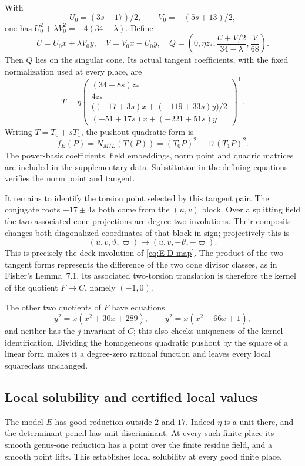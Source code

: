 \documentclass[11pt,a4paper]{article}
\theoremstyle{definition}\newtheorem{definition}[theorem]{Definition}
\theoremstyle{remark}\newtheorem{remark}[theorem]{Remark}
\begin{document}
With
\[
 U_0=(3s-17)/2,\qquad V_0=-(5s+13)/2,
\]
one has $U_0^2+\lambda V_0^2=-4(34-\lambda)$.  Define
\[
 U=U_0x+\lambda V_0y,\quad V=V_0x-U_0y,\quad
 Q=\left(0,\eta z_*,\frac{U+V/2}{34-\lambda},\frac V{68}\right).
\]
Then $Q$ lies on the singular cone.  Its actual tangent coefficients,
with the fixed normalization used at every place, are
\[
 T=\eta\begin{pmatrix}
 (34-8s)z_*\\
 4z_*\\
 \bigl((-17+3s)x+(-119+33s)y\bigr)/2\\
 (-51+17s)x+(-221+51s)y
 \end{pmatrix}^{\mathsf T}.
\]
Writing $T=T_0+sT_1$, the pushout quadratic form is
\begin{equation}\label{eq:final-norm-pushout}
 f_E(P)=N_{M/L}(T(P))=(T_0P)^2-17(T_1P)^2.
\end{equation}
The power-basis coefficients, field embeddings, norm point and quadric matrices are included in the supplementary data. Substitution in the defining equations verifies the norm point and tangent.

It remains to identify the torsion point selected by this tangent pair.
The conjugate roots $-17\pm4s$ both come from the $(u,v)$ block.
Over a splitting field the two associated cone projections are
degree-two involutions.  Their composite changes both diagonalized
coordinates of that block in sign; projectively this is
\[
 (u,v,\vartheta,\varpi)\longmapsto
                    (u,v,-\vartheta,-\varpi).
\]
This is precisely the deck involution of \eqref{eq:E-D-map}.
The product of the two tangent forms represents the difference of the
two cone divisor classes, as in Fisher's Lemma~7.1.  Its associated
two-torsion translation is therefore the kernel of the quotient
$F\longrightarrow C$, namely $(-1,0)$.  

The other two quotients of
$F$ have equations
\[
 y^2=x(x^2+30x+289),\qquad y^2=x(x^2-66x+1),
\]
and neither has the $j$-invariant of $C$; this also checks uniqueness
of the kernel identification.    Dividing the homogeneous
quadratic pushout by the square of a linear form makes it a degree-zero
rational function and leaves every local squareclass unchanged.

\subsection{Local solubility and certified local values}

The model $E$ has good reduction outside $2$ and $17$.  Indeed $\eta$
is a unit there, and the determinant pencil has unit discriminant.
At every such finite place its smooth genus-one reduction has a point
over the finite residue field, and a smooth point lifts.  This establishes local solubility at every good finite place.
\end{document}
